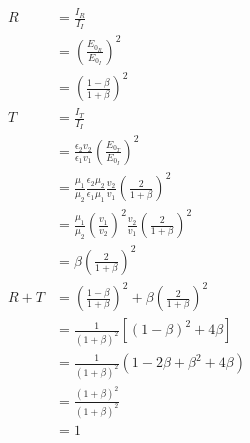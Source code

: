 \documentclass{article}
\begin{document}
\subsection{}

\begin{align*}
  R     & = \frac{I_R}{I_I}                                                                                                    \\
        & = \left( \frac{E_{0_R}}{E_{0_I}} \right)^2                                                                           \\
        & = \left( \frac{1 - \beta}{1 + \beta} \right)^2                                                                       \\
  T     & = \frac{I_T}{I_I}                                                                                                    \\
        & = \frac{\epsilon_2 v_2}{\epsilon_1 v_1} \left( \frac{E_{0_T}}{E_{0_I}} \right)^2                                     \\
        & = \frac{\mu_1}{\mu_2} \frac{\epsilon_2 \mu_2}{\epsilon_1 \mu_1} \frac{v_2}{v_1} \left( \frac{2}{1 + \beta} \right)^2 \\
        & = \frac{\mu_1}{\mu_2} \left( \frac{v_1}{v_2} \right)^2 \frac{v_2}{v_1} \left( \frac{2}{1 + \beta} \right)^2          \\
        & = \beta \left( \frac{2}{1 + \beta} \right)^2                                                                         \\
  R + T & = \left( \frac{1 - \beta}{1 + \beta} \right)^2 + \beta \left( \frac{2}{1 + \beta} \right)^2                          \\
        & = \frac{1}{(1 + \beta)^2} [(1 - \beta)^2 + 4 \beta]                                                                  \\
        & = \frac{1}{(1 + \beta)^2} (1 - 2 \beta + \beta^2 + 4 \beta)                                                          \\
        & = \frac{(1 + \beta)^2}{(1 + \beta)^2}                                                                                \\
        & = 1
\end{align*}

\setcounter{subsection}{19}
\subsection{}
\end{document}
